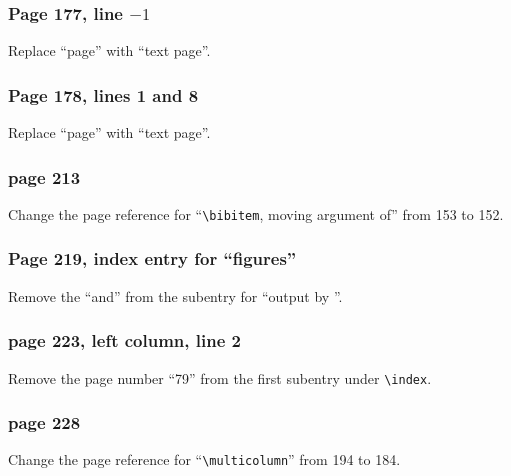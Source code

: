\subsubsection*{Page 177, line $-1$}
Replace ``page'' with ``text page''.

\subsubsection*{Page 178, lines 1 and 8}
Replace ``page'' with ``text page''.  


\subsubsection*{page 213}
Change the page reference for ``\verb|\bibitem|, moving argument of''
from 153 to 152.

\subsubsection*{Page 219, index entry for ``figures''}
Remove the ``and'' from the subentry for ``output by
\verb||''.

\subsubsection*{page 223, left column, line 2}
Remove the page number ``79'' from the first subentry
under \verb|\index|.

\subsubsection*{page 228}
Change the page reference for ``\verb|\multicolumn|''
from 194  to 184.
